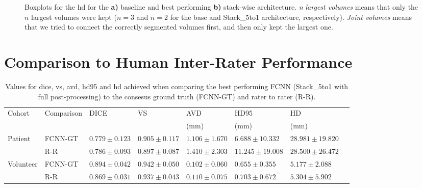 \begin{figure}[htbp]
	\centering
	\hfill
	\caption[Boxplots for the \acrlong{hd} for Post-processing]{Boxplots for the \acrlong{hd} for the \textbf{a)} baseline and best performing \textbf{b)} stack-wise architecture. \textit{n largest volumes} means that only the $n$ largest volumes were kept ($n = 3$ and $n = 2$ for the base and Stack\_5to1 architecture, respectively). \textit{Joint volumes} means that we tried to connect the correctly segmented volumes first, and then only kept the largest one.}
	\label{fig:pp_boxplots_hd}  
\end{figure}

\section{Comparison to Human Inter-Rater Performance} %

\begin{sidewaystable}[htbp]
   \centering
   \caption[Detailed Results for Comparison to Inter-Rater Performance]{Values for \acrlong{dice}, \acrlong{vs}, \acrlong{avd}, \acrlong{hd95} and \acrlong{hd} achieved when comparing the best performing FCNN (Stack\_5to1 with full post-processing) to the consesus ground truth (FCNN-GT) and rater to rater (R-R).}
   \begin{tabular}{l*{7}{l}}
      \toprule
      Cohort	& Comparison & DICE				& VS				& AVD				& HD95				& HD				\\
      			&					&					&					& (mm)				& (mm)				& (mm)				\\
      \midrule
        Patient     & FCNN-GT & $0.779 \pm 0.123$ & $\mathbf{0.905 \pm 0.117}$ & $\mathbf{1.106 \pm 1.670}$ & $\mathbf{6.688  \pm 10.332}$ & $28.981 \pm 19.820$ \\
                    & R-R     & $\mathbf{0.786 \pm 0.093}$ & $0.897 \pm 0.087$ & $1.410 \pm 2.303$ & $11.245 \pm 19.008$ & $\mathbf{28.500 \pm 26.472}$ \\
        \midrule
        Volunteer   & FCNN-GT & $\mathbf{0.894 \pm 0.042}$ & $\mathbf{0.942 \pm 0.050}$ & $\mathbf{0.102 \pm 0.060}$ & $\mathbf{0.655  \pm 0.355} $ & $\mathbf{5.177  \pm 2.088} $ \\
                    & R-R     & $0.869 \pm 0.031$ & $0.937 \pm 0.043$ & $0.110 \pm 0.075$ & $0.703  \pm 0.672 $ & $5.304  \pm 5.902 $ \\
      \bottomrule
   \end{tabular}
   \label{tab:res_fcnn_rater}
\end{sidewaystable}

